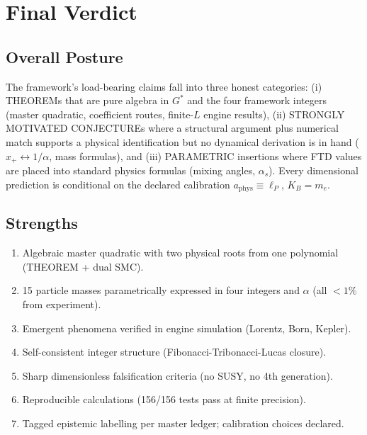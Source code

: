 \documentclass[11pt,a4paper]{article}
\begin{document}
\section{Final Verdict}

\subsection{Overall Posture}

The framework's load-bearing claims fall into three honest categories: (i) THEOREMs that are pure algebra in $G^*$ and the four framework integers (master quadratic, coefficient routes, finite-$L$ engine results), (ii) STRONGLY MOTIVATED CONJECTUREs where a structural argument plus numerical match supports a physical identification but no dynamical derivation is in hand ($x_+ \leftrightarrow 1/\alpha$, mass formulas), and (iii) PARAMETRIC insertions where FTD values are placed into standard physics formulas (mixing angles, $\alpha_s$). Every dimensional prediction is conditional on the declared calibration $a_{\text{phys}} \equiv \ell_P$, $K_B = m_e$.

\subsection{Strengths}

\begin{enumerate}
    \item Algebraic master quadratic with two physical roots from one polynomial (THEOREM + dual SMC).
    \item 15 particle masses parametrically expressed in four integers and $\alpha$ (all $< 1\%$ from experiment).
    \item Emergent phenomena verified in engine simulation (Lorentz, Born, Kepler).
    \item Self-consistent integer structure (Fibonacci-Tribonacci-Lucas closure).
    \item Sharp dimensionless falsification criteria (no SUSY, no 4th generation).
    \item Reproducible calculations (156/156 tests pass at finite precision).
    \item Tagged epistemic labelling per master ledger; calibration choices declared.
\end{enumerate}
\end{document}
